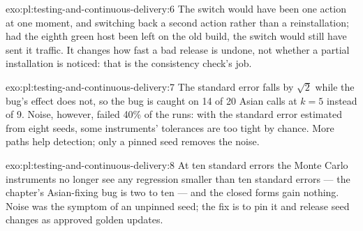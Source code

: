 \begin{solution}{exo:pl:testing-and-continuous-delivery:6}
The switch would have been one action at one moment, and switching back a second action rather than a reinstallation; had the eighth green
host been left on the old build, the switch would still have sent it traffic. It changes how fast a bad release is undone, not whether a
partial installation is noticed: that is the consistency check's job.
\end{solution}

\begin{solution}{exo:pl:testing-and-continuous-delivery:7}
The standard error falls by $\sqrt2$ while the bug's effect does not, so the bug is caught on 14 of 20 Asian calls at $k=5$ instead of 9.
Noise, however, failed 40\% of the runs: with the standard error estimated from eight seeds, some instruments' tolerances are too tight by
chance. More paths help detection; only a pinned seed removes the noise.
\end{solution}

\begin{solution}{exo:pl:testing-and-continuous-delivery:8}
At ten standard errors the Monte Carlo instruments no longer see any regression smaller than ten standard errors --- the chapter's Asian-fixing
bug is two to ten --- and the closed forms gain nothing. Noise was the symptom of an unpinned seed; the fix is to pin it and release seed
changes as approved golden updates.
\end{solution}

